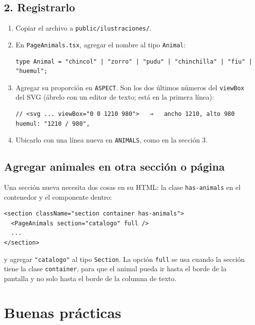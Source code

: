 \documentclass[11pt,a4paper]{article}
\newcommand{\code}[1]{\texttt{\small #1}}
\begin{document}
\subsection{2. Registrarlo}

\begin{enumerate}
  \item Copiar el archivo a \code{public/ilustraciones/}.
  \item En \code{PageAnimals.tsx}, agregar el nombre al tipo \code{Animal}:
\begin{lstlisting}
type Animal = "chincol" | "zorro" | "pudu" | "chinchilla" | "fiu" | "huemul";
\end{lstlisting}
  \item Agregar su proporción en \code{ASPECT}. Son los dos últimos números del \code{viewBox} del SVG (ábrelo con un editor de texto; está en la primera línea):
\begin{lstlisting}
// <svg ... viewBox="0 0 1210 980">   →   ancho 1210, alto 980
huemul: "1210 / 980",
\end{lstlisting}
  \item Ubicarlo con una línea nueva en \code{ANIMALS}, como en la sección 3.
\end{enumerate}

\subsection{Agregar animales en otra sección o página}

Una sección nueva necesita dos cosas en su HTML: la clase \code{has-animals} en el contenedor y el componente dentro:

\begin{lstlisting}
<section className="section container has-animals">
  <PageAnimals section="catalogo" full />
  ...
</section>
\end{lstlisting}

y agregar \code{"catalogo"} al tipo \code{Section}. La opción \code{full} se usa cuando la sección tiene la clase \code{container}, para que el animal pueda ir hasta el borde de la pantalla y no solo hasta el borde de la columna de texto.

\section{Buenas prácticas}
\end{document}
